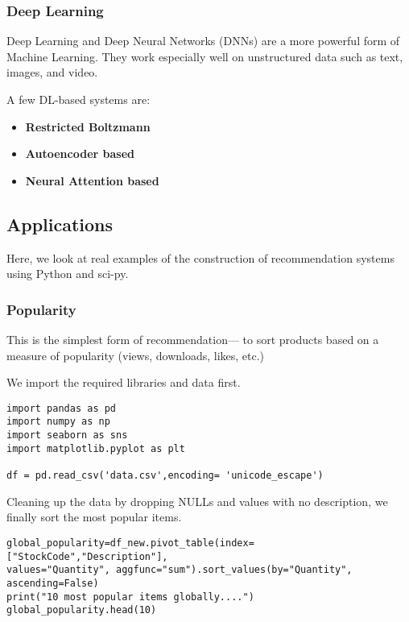 \documentclass{article}
\begin{document}
\subsubsection{Deep Learning}

Deep Learning and Deep Neural Networks (DNNs) are a more powerful form of Machine Learning. They work especially well on unstructured data such as text, images, and video.

\noindent A few DL-based systems are:

\begin{itemize}
    \item{\textbf{Restricted Boltzmann}}
    \item{\textbf{Autoencoder based}}
    \item{\textbf{Neural Attention based}}
\end{itemize}

\subsection{Applications}

Here, we look at real examples of the construction of recommendation systems using Python and sci-py.

\subsubsection{Popularity}

This is the simplest form of recommendation— to sort products based on a measure of popularity (views, downloads, likes, etc.)

\medskip

\noindent We import the required libraries and data first.

\begin{lstlisting}
import pandas as pd
import numpy as np
import seaborn as sns
import matplotlib.pyplot as plt

df = pd.read_csv('data.csv',encoding= 'unicode_escape')
\end{lstlisting}

\noindent Cleaning up the data by dropping NULLs and values with no description, we finally sort the most popular items.

\begin{lstlisting}
global_popularity=df_new.pivot_table(index=["StockCode","Description"],
values="Quantity", aggfunc="sum").sort_values(by="Quantity", ascending=False)
print("10 most popular items globally....")
global_popularity.head(10)
\end{lstlisting}
\end{document}
